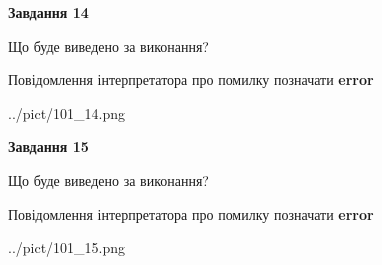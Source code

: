 \documentclass[11pt, ukrainian]{article}
\begin{document}
{\begin {large}
{\begin {center}\textbf{Завдання 14}\end {center}}\par
Що буде виведено за виконання? \par
Повідомлення інтерпретатора про помилку позначати \textbf{error}

\begin{center}
	{../pict/101_14.png}
\end{center}
\newpage

{\begin {center}\textbf{Завдання 15}\end {center}}\par
Що буде виведено за виконання? \par
Повідомлення інтерпретатора про помилку позначати \textbf{error}

\begin{center}
	{../pict/101_15.png}
\end{center}
\newpage

\end {large}}
\end{document}
